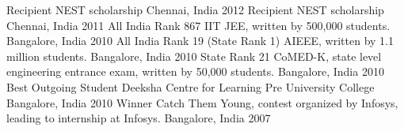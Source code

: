 \begin{cvhonors}
	\cvhonor
	{Recipient}
	{NEST scholarship}
	{Chennai, India}
	{2012}
	\cvhonor
	{Recipient}
	{NEST scholarship}
	{Chennai, India}
	{2011}
	\cvhonor
	{All India Rank 867}
	{IIT JEE, written by 500,000 students.}
	{Bangalore, India}
	{2010}
	\cvhonor
	{All India Rank 19 (State Rank 1)}
	{AIEEE, written by 1.1 million students.}
	{Bangalore, India}
	{2010}
	\cvhonor
	{State Rank 21}
	{CoMED-K, state level engineering entrance exam, written by 50,000 students.}
	{Bangalore, India}
	{2010}
	\cvhonor
	{Best Outgoing Student}
	{Deeksha Centre for Learning Pre University College}
	{Bangalore, India}
	{2010}
	\cvhonor
	{Winner}
	{Catch Them Young, contest organized by Infosys, leading to internship at Infosys.}
	{Bangalore, India}
	{2007}
\end{cvhonors}
